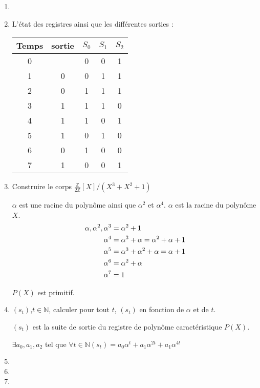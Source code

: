 \documentclass[a4paper,10pt]{article}
\newcommand{\N}{\mathbb{N}}
\newcommand{\Z}{\mathbb{Z}}
\begin{document}
\begin{enumerate}
\item \item
L'état des registres ainsi que les différentes sorties :


\begin{table}[h]
		\centering
		\begin{tabular}{|c|c|c|c|c|}
			\hline
			\rowcolor[HTML]{EFEFEF} \hline
			\cellcolor[HTML]{EFEFEF}\textbf{Temps}  & \cellcolor[HTML]{EFEFEF}\textbf{sortie} & \cellcolor[HTML]{EFEFEF}\textbf{$ S_{0} $} & \cellcolor[HTML]{EFEFEF}\textbf{$ S_{1} $} & \cellcolor[HTML]{EFEFEF}\textbf{$ S_{2} $} \\ \hline
			0 &   & 0 & 0 & 1 \\ \hline
			1 & 0 & 0 & 1 & 1 \\ \hline
			2 & 0 & 1 & 1 & 1 \\ \hline
			3 & 1 & 1 & 1 & 0 \\ \hline
			4 & 1 & 1 & 0 & 1 \\ \hline
			5 & 1 & 0 & 1 & 0 \\ \hline
			6 & 0 & 1 & 0 & 0 \\ \hline
			7 & 1 & 0 & 0 & 1 \\ \hline
		\end{tabular}
	\end{table}

\item
Construire le corps $\frac{\Z}{2\Z}[X]/(X^3+X^2+1)$

$\alpha $ est une racine du polynôme ainsi que $\alpha^2$ et $\alpha^4$.
$\alpha $ est la racine du polynôme $X$.
\begin{align}
	\alpha, \alpha^2, \alpha^3 &= \alpha^2+1 \notag \\
	\alpha^4 &= \alpha^3+\alpha=\alpha^2+\alpha+1 \notag \\
	\alpha^5 &= \alpha^3+\alpha^2+\alpha=\alpha+1 \notag \\
	\alpha^6 &= \alpha^2+\alpha \notag \\
	\alpha^7 &= 1 \notag
\end{align}

$P(X)$ est primitif.

\item
$(s_t)$,$t \in \N$, calculer pour tout $t$, $(s_t)$ en fonction de $\alpha$ et de $t$.

$(s_t)$ est la suite de sortie du registre de polynôme caractéristique $P(X)$.

$\exists a_0, a_1, a_2$ tel que 
$\forall t \in \N (s_t)=a_0\alpha^t+a_1 \alpha^{2t}+a_1 \alpha^{4t}$


\item

\item


\item


\end{enumerate}
\end{document}
